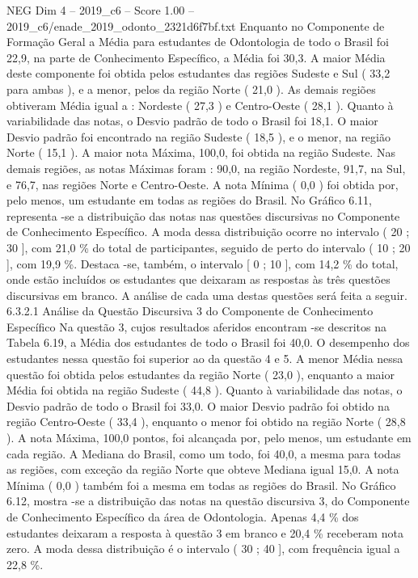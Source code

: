 \begin{textsample}{NEG Dim 4 – 2019\_c6 – Score 1.00 – 2019\_c6/enade\_2019\_odonto\_2321d6f7bf.txt}
Enquanto no Componente de Formação Geral a Média para estudantes de Odontologia de todo o Brasil foi 22,9, na parte de Conhecimento Específico, a Média foi 30,3.
A maior Média deste componente foi obtida pelos estudantes das regiões Sudeste e Sul ( 33,2 para ambas ), e a menor, pelos da região Norte ( 21,0 ).
As demais regiões obtiveram Média igual a : Nordeste ( 27,3 ) e Centro-Oeste ( 28,1 ).
Quanto à variabilidade das notas, o Desvio padrão de todo o Brasil foi 18,1.
O maior Desvio padrão foi encontrado na região Sudeste ( 18,5 ), e o menor, na região Norte ( 15,1 ).
A maior nota Máxima, 100,0, foi obtida na região Sudeste.
Nas demais regiões, as notas Máximas foram : 90,0, na região Nordeste, 91,7, na Sul, e 76,7, nas regiões Norte e Centro-Oeste.
A nota Mínima ( 0,0 ) foi obtida por, pelo menos, um estudante em todas as regiões do Brasil.
No Gráfico 6.11, representa -se a distribuição das notas nas questões discursivas no Componente de Conhecimento Específico.
A moda dessa distribuição ocorre no intervalo ( 20 ; 30 ], com 21,0 \% do total de participantes, seguido de perto do intervalo ( 10 ; 20 ], com 19,9 \%.
Destaca -se, também, o intervalo [ 0 ; 10 ], com 14,2 \% do total, onde estão incluídos os estudantes que deixaram as respostas às três questões discursivas em branco.
A análise de cada uma destas questões será feita a seguir. 6.3.2.1 Análise da Questão Discursiva 3 do Componente de Conhecimento Específico Na questão 3, cujos resultados aferidos encontram -se descritos na Tabela 6.19, a Média dos estudantes de todo o Brasil foi 40,0.
O desempenho dos estudantes nessa questão foi superior ao da questão 4 e 5.
A menor Média nessa questão foi obtida pelos estudantes da região Norte ( 23,0 ), enquanto a maior Média foi obtida na região Sudeste ( 44,8 ).
Quanto à variabilidade das notas, o Desvio padrão de todo o Brasil foi 33,0.
O maior Desvio padrão foi obtido na região Centro-Oeste ( 33,4 ), enquanto o menor foi obtido na região Norte ( 28,8 ).
A nota Máxima, 100,0 pontos, foi alcançada por, pelo menos, um estudante em cada região.
A Mediana do Brasil, como um todo, foi 40,0, a mesma para todas as regiões, com exceção da região Norte que obteve Mediana igual 15,0.
A nota Mínima ( 0,0 ) também foi a mesma em todas as regiões do Brasil.
No Gráfico 6.12, mostra -se a distribuição das notas na questão discursiva 3, do Componente de Conhecimento Específico da área de Odontologia.
Apenas 4,4 \% dos estudantes deixaram a resposta à questão 3 em branco e 20,4 \% receberam nota zero.
A moda dessa distribuição é o intervalo ( 30 ; 40 ], com frequência igual a 22,8 \%.

\end{textsample}
